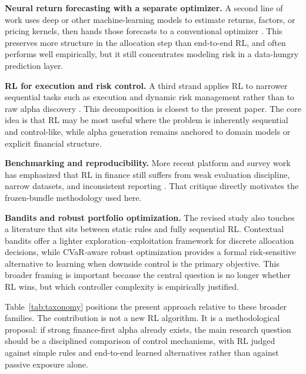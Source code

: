\documentclass[11pt]{article}
\begin{document}
\textbf{Neural return forecasting with a separate optimizer.} A second line of
work uses deep or other machine-learning models to estimate returns, factors, or
pricing kernels, then hands those forecasts to a conventional optimizer
\cite{gu2020,chen2021,giglio2022}. This preserves more structure in the
allocation step than end-to-end RL, and often performs well empirically, but it
still concentrates modeling risk in a data-hungry prediction layer.

\textbf{RL for execution and risk control.} A third strand applies RL to
narrower sequential tasks such as execution and dynamic risk management rather
than to raw alpha discovery \cite{nevmyvaka2006,kolm2019hedge,buehler2019,du2020}.
This decomposition is closest to the present paper. The core idea is that RL
may be most useful where the problem is inherently sequential and control-like,
while alpha generation remains anchored to domain models or explicit financial
structure.

\textbf{Benchmarking and reproducibility.} More recent platform and survey work
has emphasized that RL in finance still suffers from weak evaluation discipline,
narrow datasets, and inconsistent reporting \cite{sun2023,jander2025}. That
critique directly motivates the frozen-bundle methodology used here.

\textbf{Bandits and robust portfolio optimization.} The revised study also
touches a literature that sits between static rules and fully sequential RL.
Contextual bandits offer a lighter exploration--exploitation framework for
discrete allocation decisions, while CVaR-aware robust optimization provides a
formal risk-sensitive alternative to learning when downside control is the
primary objective. This broader framing is important because the central
question is no longer whether RL wins, but which controller complexity is
empirically justified.

Table~\ref{tab:taxonomy} positions the present approach relative to these
broader families. The contribution is not a new RL algorithm. It is a
methodological proposal: if strong finance-first alpha already exists, the main
research question should be a disciplined comparison of control mechanisms, with
RL judged against simple rules and end-to-end learned alternatives rather than
against passive exposure alone.
\end{document}
